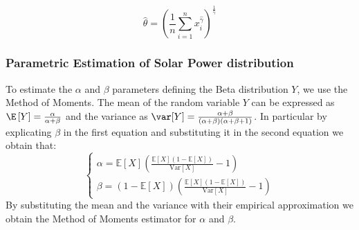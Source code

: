 \begin{equation}
\hat{\theta} = \left( \frac{1}{n} \sum_{i=1}^{n} x_i^{\hat{\gamma}} \right)^{\frac{1}{\hat{\gamma}}}
\end{equation}




\subsubsection{Parametric Estimation of Solar Power distribution}
\label{subsection: beta estim}

To estimate the \(\alpha\) and \(\beta\) parameters defining the Beta distribution \(Y\), we use the Method of Moments.
The mean of the random variable \(Y\) can be expressed as \(\E\left[ Y\right] = \frac{\alpha}{\alpha + \beta} \) and the variance as \(\var [Y]= \frac{\alpha + \beta}{(\alpha + \beta)(\alpha + \beta + 1)}\). In particular by explicating \(\beta\) in the first equation and substituting it in the second equation we obtain that:
\begin{equation}
\begin{cases}
\alpha = \mathbb{E}[X] \left( \frac{\mathbb{E}[X](1 - \mathbb{E}[X])}{\mathrm{Var}[X]} - 1 \right) \\
\beta = (1 - \mathbb{E}[X]) \left( \frac{\mathbb{E}[X](1 - \mathbb{E}[X])}{\mathrm{Var}[X]} - 1 \right)
\end{cases}
\end{equation}
By substituting the mean and the variance with their empirical approximation we obtain the Method of Moments estimator for \(\alpha\) and \(\beta\).


